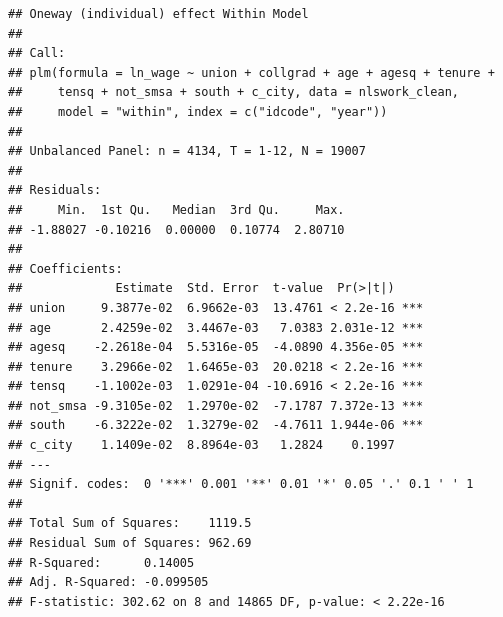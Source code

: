 \documentclass[
]{article}
\begin{document}
\begin{verbatim}
## Oneway (individual) effect Within Model
## 
## Call:
## plm(formula = ln_wage ~ union + collgrad + age + agesq + tenure + 
##     tensq + not_smsa + south + c_city, data = nlswork_clean, 
##     model = "within", index = c("idcode", "year"))
## 
## Unbalanced Panel: n = 4134, T = 1-12, N = 19007
## 
## Residuals:
##     Min.  1st Qu.   Median  3rd Qu.     Max. 
## -1.88027 -0.10216  0.00000  0.10774  2.80710 
## 
## Coefficients:
##             Estimate  Std. Error  t-value  Pr(>|t|)    
## union     9.3877e-02  6.9662e-03  13.4761 < 2.2e-16 ***
## age       2.4259e-02  3.4467e-03   7.0383 2.031e-12 ***
## agesq    -2.2618e-04  5.5316e-05  -4.0890 4.356e-05 ***
## tenure    3.2966e-02  1.6465e-03  20.0218 < 2.2e-16 ***
## tensq    -1.1002e-03  1.0291e-04 -10.6916 < 2.2e-16 ***
## not_smsa -9.3105e-02  1.2970e-02  -7.1787 7.372e-13 ***
## south    -6.3222e-02  1.3279e-02  -4.7611 1.944e-06 ***
## c_city    1.1409e-02  8.8964e-03   1.2824    0.1997    
## ---
## Signif. codes:  0 '***' 0.001 '**' 0.01 '*' 0.05 '.' 0.1 ' ' 1
## 
## Total Sum of Squares:    1119.5
## Residual Sum of Squares: 962.69
## R-Squared:      0.14005
## Adj. R-Squared: -0.099505
## F-statistic: 302.62 on 8 and 14865 DF, p-value: < 2.22e-16
\end{verbatim}
\end{document}
